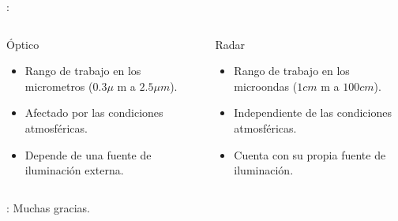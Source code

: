 \begin{frame}{\secname : \subsecname}
\begin{columns}
  \begin{column}{0.5\textwidth}
   \begin{block}{Óptico}
     \begin{itemize}
       \item Rango de trabajo en los micrometros ($0.3\mu$ m a $2.5\mu m$).
       \item Afectado por las condiciones atmosféricas.
       \item Depende de una fuente de iluminación externa.
     \end{itemize}
   \end{block}
  \end{column}
  \begin{column}{0.5\textwidth}  %
    \begin{block}{Radar}
      \begin{itemize}
        \item Rango de trabajo en los microondas ($1cm$ m a $100cm$).
        \item Independiente de las condiciones atmosféricas.
        \item Cuenta con su propia fuente de iluminación.
      \end{itemize}
    \end{block}
  \end{column}
  \end{columns}
\end{frame}

\begin{frame}{\secname : \subsecname}
Muchas gracias.
\end{frame}
